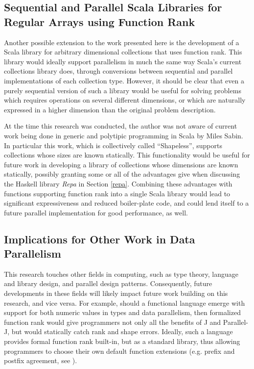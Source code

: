 \subsection{Sequential and Parallel Scala Libraries for Regular Arrays using Function Rank}
Another possible extension to the work presented here 
is the development of a Scala library for arbitrary dimensional collections that uses function rank. 
This library would ideally support parallelism in much the same way 
Scala's current collections library does\cite{pc},
through conversions between sequential and parallel implementations of each collection type. 
However, it should be clear that even 
a purely sequential version of such a library would be useful 
for solving problems which requires operations on several different dimensions, 
or which are naturally expressed in a higher dimension than the original problem description.

At the time this research was conducted, 
the author was not aware of current work being done in 
generic and polytipic programming in Scala by Miles Sabin. 
In particular this work, which is collectively called ``Shapeless''\cite{shapeless}, 
supports collections whose sizes are known statically. 
This functionality would be useful for future work in developing 
a library of collections whose dimensions are known statically, 
possibly granting some or all of the advantages give when discussing 
the Haskell library \textit{Repa} in Section \ref{repa}\cite{dph}.
Combining these advantages with functions supporting function rank into a single Scala library
would lead to significant expressiveness and reduced boiler-plate code, 
and could lend itself to a future parallel implementation for good performance, as well.

\subsection{Implications for Other Work in Data Parallelism}
This research touches other fields in computing, 
such as type theory, language and library design, and parallel design patterns.
Consequently, future developments in these fields will likely impact 
future work building on this research, and vice versa. 
For example, should a functional language emerge 
with support for both numeric values in types and data parallelism, 
then formalized function rank would give programmers not only 
all the benefits of J and Parallel-J, 
but would statically catch rank and shape errors. 
Ideally, such a language provides formal function rank built-in, 
but as a standard library, thus allowing programmers 
to choose their own default function extensions (e.g. prefix and postfix agreement, see \cite{rankanduni}).

